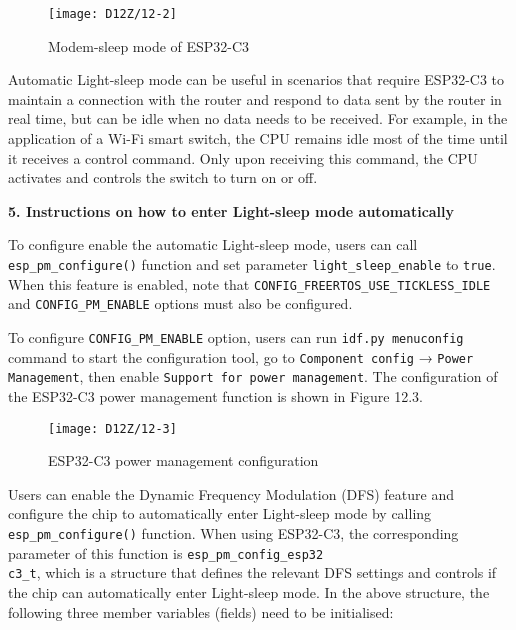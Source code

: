 \documentclass[a4paper,12pt]{book}
\begin{document}
\begin{figure}[!h]
    \centering
    \texttt{[image: D12Z/12-2]}
    \caption{Modem-sleep mode of ESP32-C3}
\end{figure}

Automatic Light-sleep mode can be useful in scenarios that require ESP32-C3 to maintain a connection with the router and respond to data sent by the router in real time, but can be idle when no data needs to be received. For example, in the application of a Wi-Fi smart switch, the CPU remains idle most of the time until it receives a control command. Only upon receiving this command, the CPU activates and controls the switch to turn on or off.

\textbf{5. Instructions on how to enter Light-sleep mode automatically}

To configure enable the automatic Light-sleep mode, users can call \verb|esp_pm_configure()| function and set parameter \verb|light_sleep_enable| to \verb|true|. When this feature is enabled, note that \verb|CONFIG_FREERTOS_USE_TICKLESS_IDLE| and \verb|CONFIG_PM_ENABLE| options must also be configured.

To configure \verb|CONFIG_PM_ENABLE| option, users can run \verb|idf.py menuconfig| command to start the configuration tool, go to \verb|Component config| → \verb|Power Management|, then enable \verb|Support for power management|. The configuration of the ESP32-C3 power management function is shown in Figure 12.3.

\begin{figure}[!h]
    \centering
    \texttt{[image: D12Z/12-3]}
    \caption{ESP32-C3 power management configuration}
\end{figure}

Users can enable the Dynamic Frequency Modulation (DFS) feature and configure the chip to automatically enter Light-sleep mode by calling \verb|esp_pm_configure()| function. When using ESP32-C3, the corresponding parameter of this function is \verb|esp_pm_config_esp32|\\ \verb|c3_t|, which is a structure that defines the relevant DFS settings and controls if the chip can automatically enter Light-sleep mode. In the above structure, the following three member variables (fields) need to be initialised:
\end{document}
